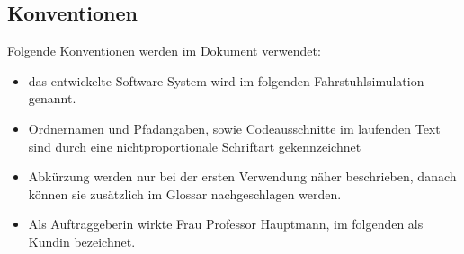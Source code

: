 \subsection*{Konventionen}
Folgende Konventionen werden im Dokument verwendet:\\
\begin{itemize}
	\item das entwickelte Software-System wird im folgenden Fahrstuhlsimulation genannt.
	\item Ordnernamen und Pfadangaben, sowie Codeausschnitte im laufenden Text sind durch eine nichtproportionale Schriftart gekennzeichnet
	\item Abkürzung werden nur bei der ersten Verwendung näher beschrieben, danach können sie zusätzlich im Glossar nachgeschlagen werden.
	\item Als Auftraggeberin wirkte Frau Professor Hauptmann, im folgenden als Kundin bezeichnet.
\end{itemize}
